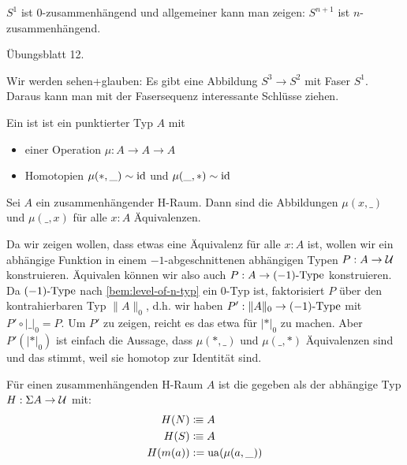 \begin{bemerkung}
  $S^1$ ist $0$-zusammenhängend und allgemeiner kann man zeigen: $S^{n+1}$ ist $n$-zusammenhängend.
\end{bemerkung}
\begin{beweis}
  Übungsblatt 12.
\end{beweis}

Wir werden sehen+glauben: Es gibt eine Abbildung $S^3\to S^2$ mit Faser $S^1$.
Daraus kann man mit der Fasersequenz interessante Schlüsse ziehen.

\begin{definition}
  Ein  ist ist ein punktierter Typ $A$ mit
  \begin{itemize}
  \item einer Operation $\mu:A\to A\to A$
  \item Homotopien $\mu(\ast,\_)\sim \mathrm{id}$ und $\mu(\_,\ast)\sim\mathrm{id}$
  \end{itemize}
\end{definition}

\begin{lemma}
  Sei $A$ ein zusammenhängender H-Raum. Dann sind die Abbildungen $\mu(x,\_)$ und $\mu(\_,x)$ für alle $x:A$ Äquivalenzen.
\end{lemma}
\begin{beweis}
  Da wir zeigen wollen, dass etwas eine Äquivalenz für alle $x:A$ ist, wollen wir ein abhängige Funktion in einem $-1$-abgeschnittenen abhängigen Typen $P:A\to\mathcal{U}$ konstruieren.
  Äquivalen können wir also auch $P:A\to (-1)\hbox{-}\mathrm{Type}$ konstruieren.
  Da $(-1)\hbox{-}\mathrm{Type}$ nach \cref{bem:level-of-n-typ} ein $0$-Typ ist, faktorisiert $P$ über den kontrahierbaren Typ $\|A\|_0$,
  d.h. wir haben $P':\|A\|_0\to (-1)\hbox{-}\mathrm{Type}$ mit $P'\circ |\_|_0=P$.
  Um $P'$ zu zeigen, reicht es das etwa für $|\ast|_0$ zu machen. Aber $P'(|\ast|_0)$ ist einfach die Aussage, dass $\mu(\ast,\_)$ und $\mu(\_,\ast)$ Äquivalenzen sind und das stimmt, weil sie homotop zur Identität sind.
\end{beweis}

\begin{definition}
  Für einen zusammenhängenden H-Raum $A$ ist die  gegeben als der abhängige Typ $H:\Sigma A\to\mathcal{U}$ mit:
  \begin{align*}
    H(N)&\vcentcolon\mspace{-1.2mu}\equiv A \\
    H(S)&\vcentcolon\mspace{-1.2mu}\equiv A \\
    H(m(a))&:= \mathrm{ua}(\mu(a,\_))
  \end{align*}
\end{definition}

